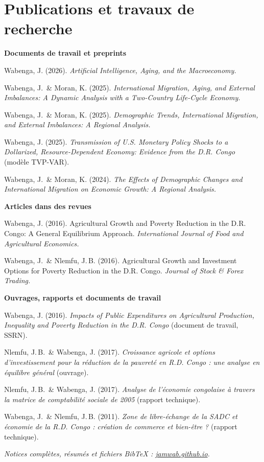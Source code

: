 \documentclass[11pt,letterpaper]{article}
\newcommand{\meta}[1]{{\small\itshape\color{soft}#1}}
\begin{document}
\section{Publications et travaux de recherche}
\textbf{Documents de travail et preprints}
\begin{tight}
  \item Wabenga, J. (2026). \textit{Artificial Intelligence, Aging, and the Macroeconomy.}
  \item Wabenga, J.\ \& Moran, K. (2025). \textit{International Migration, Aging, and External Imbalances: A Dynamic Analysis with a Two-Country Life-Cycle Economy.}
  \item Wabenga, J.\ \& Moran, K. (2025). \textit{Demographic Trends, International Migration, and External Imbalances: A Regional Analysis.}
  \item Wabenga, J. (2025). \textit{Transmission of U.S. Monetary Policy Shocks to a Dollarized, Resource-Dependent Economy: Evidence from the D.R. Congo} (modèle TVP-VAR).
  \item Wabenga, J.\ \& Moran, K. (2024). \textit{The Effects of Demographic Changes and International Migration on Economic Growth: A Regional Analysis.}
\end{tight}
\textbf{Articles dans des revues}
\begin{tight}
  \item Wabenga, J. (2016). Agricultural Growth and Poverty Reduction in the D.R. Congo: A General Equilibrium Approach. \textit{International Journal of Food and Agricultural Economics.}
  \item Wabenga, J.\ \& Nlemfu, J.\,B. (2016). Agricultural Growth and Investment Options for Poverty Reduction in the D.R. Congo. \textit{Journal of Stock \& Forex Trading.}
\end{tight}
\textbf{Ouvrages, rapports et documents de travail}
\begin{tight}
  \item Wabenga, J. (2016). \textit{Impacts of Public Expenditures on Agricultural Production, Inequality and Poverty Reduction in the D.R. Congo} (document de travail, SSRN).
  \item Nlemfu, J.\,B.\ \& Wabenga, J. (2017). \textit{Croissance agricole et options d'investissement pour la réduction de la pauvreté en R.D. Congo : une analyse en équilibre général} (ouvrage).
  \item Nlemfu, J.\,B.\ \& Wabenga, J. (2017). \textit{Analyse de l'économie congolaise à travers la matrice de comptabilité sociale de 2005} (rapport technique).
  \item Wabenga, J.\ \& Nlemfu, J.\,B. (2011). \textit{Zone de libre-échange de la SADC et économie de la R.D. Congo : création de commerce et bien-être ?} (rapport technique).
\end{tight}
\meta{Notices complètes, résumés et fichiers BibTeX : \href{https://jamwab.github.io}{jamwab.github.io}.}
\end{document}
